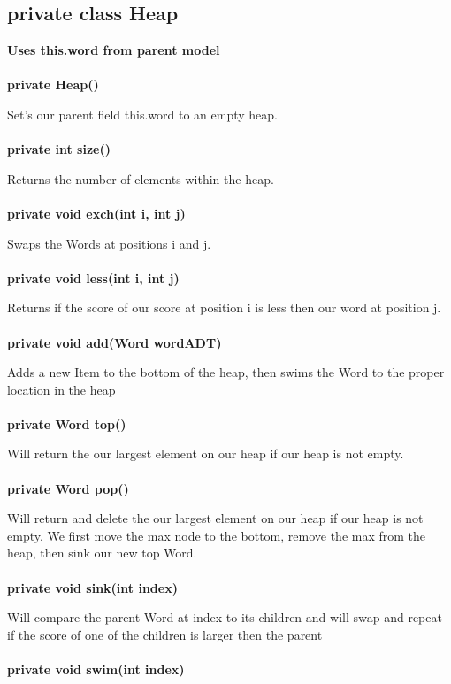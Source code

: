 \documentclass[11pt]{article}
\begin{document}
\subsection{private class Heap}
\textbf{Uses this.word from parent model\\\\}
%
\textbf{private Heap()\\}

Set's our parent field this.word to an empty heap.\\\\
%
\textbf{private int size()\\}

Returns the number of elements within the heap.\\\\
%
\textbf{private void exch(int i, int j)\\}

Swaps the Words at positions i and j.\\\\
%
\textbf{private void less(int i, int j)\\}

Returns if the score of our score at position i is less then our word at position j.\\\\
%
\textbf{private void add(Word wordADT)\\}

Adds a new Item to the bottom of the heap, then swims the Word to the proper location in the heap\\\\
%
\textbf{private Word top()\\}

Will return the our largest element on our heap if our heap is not empty.\\\\
%
\textbf{private Word pop()\\}

Will return and delete the our largest element on our heap if our heap is not empty. We first move the max node to the bottom, remove the max from the heap, then sink our new top Word.\\\\
%
\textbf{private void sink(int index)\\}

Will compare the parent Word at index to its children and will swap and repeat if the score of one of the children is larger then the parent\\\\
%
\textbf{private void swim(int index)\\}
\end{document}
